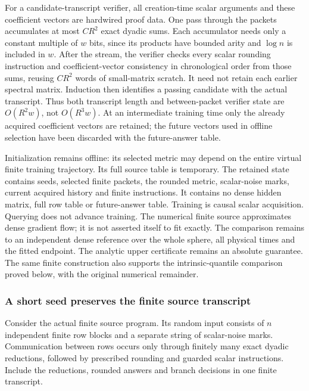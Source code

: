 For a candidate-transcript verifier, all creation-time scalar arguments and these coefficient vectors are hardwired proof data. One pass through the packets accumulates at most \(CR^2\) exact dyadic sums. Each accumulator needs only a constant multiple of \(w\) bits, since its products have bounded arity and \(\log n\) is included in \(w\). After the stream, the verifier checks every scalar rounding instruction and coefficient-vector consistency in chronological order from those sums, reusing \(CR^2\) words of small-matrix scratch. It need not retain each earlier spectral matrix. Induction then identifies a passing candidate with the actual transcript. Thus both transcript length and between-packet verifier state are \(O(R^2w)\), not \(O(R^3w)\). At an intermediate training time only the already acquired coefficient vectors are retained; the future vectors used in offline selection have been discarded with the future-answer table.



Initialization remains offline: its selected metric may depend on the entire virtual finite training trajectory. Its full source table is temporary. The retained state contains seeds, selected finite packets, the rounded metric, scalar-noise marks, current acquired history and finite instructions. It contains no dense hidden matrix, full row table or future-answer table. Training is causal scalar acquisition. Querying does not advance training. The numerical finite source approximates dense gradient flow; it is not asserted itself to fit exactly. The comparison remains to an independent dense reference over the whole sphere, all physical times and the fitted endpoint. The analytic upper certificate remains an absolute guarantee. The same finite construction also supports the intrinsic-quantile comparison proved below, with the original numerical remainder.


\subsubsection{A short seed preserves the finite source transcript}



Consider the actual finite source program. Its random input consists of \(n\) independent finite row blocks and a separate string of scalar-noise marks. Communication between rows occurs only through finitely many exact dyadic reductions, followed by prescribed rounding and guarded scalar instructions. Include the reductions, rounded answers and branch decisions in one finite transcript.


